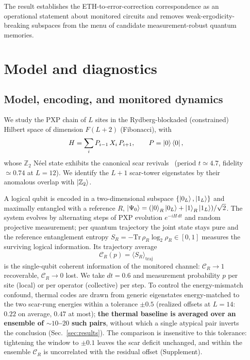 \documentclass[aps,prxquantum,twocolumn,superscriptaddress,floatfix,longbibliography]{revtex4-2}
\newcommand{\CR}{\mathcal{C}_R}
\newcommand{\Ztwo}{\mathbb{Z}_2}
\begin{document}
The result establishes the ETH-to-error-correction correspondence as an operational
statement about monitored circuits and removes weak-ergodicity-breaking subspaces
from the menu of candidate measurement-robust quantum memories.

\section{Model and diagnostics}

\subsection{Model, encoding, and monitored dynamics}

We study the PXP chain of $L$ sites in the Rydberg-blockaded (constrained)
Hilbert space of dimension $F(L{+}2)$ (Fibonacci), with
\begin{equation}
H = \sum_i P_{i-1}\, X_i\, P_{i+1}, \qquad P=\ket{0}\bra{0},
\end{equation}
whose $\Ztwo$ N\'eel state exhibits the canonical scar
revivals~\cite{Bernien2017,Turner2018,Lin2019,Ho2019} (period
$t\simeq4.7$, fidelity $\simeq0.74$ at $L=12$). We identify the $L{+}1$ scar-tower
eigenstates by their anomalous overlap with $\ket{\Ztwo}$.

A logical qubit is encoded in a two-dimensional subspace
$\{\ket{0_L},\ket{1_L}\}$ and maximally entangled with a reference $R$,
$\ket{\Psi_0}=(\ket{0}_R\ket{0_L}+\ket{1}_R\ket{1_L})/\sqrt2$. The system
evolves by alternating steps of PXP evolution $e^{-iH\,dt}$ and random projective
measurement; per quantum trajectory the joint state stays pure and the reference
entanglement entropy $S_R=-\mathrm{Tr}\,\rho_R\log_2\rho_R\in[0,1]$ measures the
surviving logical information. Its trajectory average
\begin{equation}
\CR(p) = \big\langle S_R \big\rangle_{\text{traj}}
\end{equation}
is the single-qubit coherent information of the monitored channel: $\CR\to1$
recoverable, $\CR\to0$ lost. We take $dt=0.6$ and measurement probability $p$
per site (local) or per operator (collective) per step. To control the
energy-mismatch confound, thermal codes are drawn from generic eigenstates
energy-matched to the two scar-rung energies within a tolerance $\pm0.5$
(realized offsets at $L{=}14$: $0.22$ on average, $0.47$ at most);
\textbf{the thermal baseline is averaged over an ensemble of $\sim\!10$--$20$
such pairs}, without which a single atypical pair inverts the conclusion
(Sec.~\ref{sec:results}). The comparison is insensitive to this tolerance:
tightening the window to $\pm0.1$ leaves the scar deficit unchanged, and
within the ensemble $\CR$ is uncorrelated with the residual offset
(Supplement).
\end{document}
